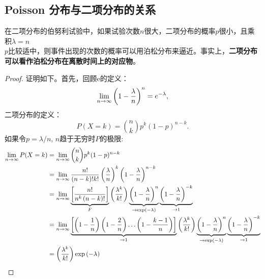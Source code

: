 \documentclass[openany]{book}
\begin{document}
\subsection{Poisson 分布与二项分布的关系}
在二项分布的伯努利试验中，如果试验次数$n$很大，二项分布的概率$p$很小，且乘积$\lambda = n$ \\$p$比较适中，则事件出现的次数的概率可以用泊松分布来逼近。事实上，\textbf{二项分布可以看作泊松分布在离散时间上的对应物}。
\begin{proof}
证明如下。首先，回顾e的定义：
$$
\lim _{{n\to \infty }}\left(1-{\lambda  \over n}\right)^{n}=e^{{-\lambda }},
$$
二项分布的定义：
$$
P(X=k)={n \choose k}p^{k}(1-p)^{{n-k}}.
$$
如果令$p=\lambda /n$, $n$趋于无穷时$P$的极限:
$$
\begin{aligned}
\lim_{{n \to \infty }}P(X=k) & =\lim _{{n\to \infty }}{n \choose k}p^{k}(1-p)^{{n-k}}\\
& = \lim _{{n\to \infty }}{n! \over (n-k)!k!}\left({\lambda \over n}\right)^{k}\left(1-{\lambda \over n}\right)^{{n-k}}\\
& = \lim _{{n\to \infty }}\underbrace {\left[{\frac {n!}{n^{k}\left(n-k\right)!}}\right]}_{F}\left({\frac {\lambda ^{k}}{k!}}\right)\underbrace {\left(1-{\frac {\lambda }{n}}\right)^{n}}_{{\to \exp \left(-\lambda \right)}}\underbrace {\left(1-{\frac {\lambda }{n}}\right)^{{-k}}}_{{\to 1}}\\
& = \lim _{{n\to \infty }}\underbrace {\left[\left(1-{\frac {1}{n}}\right)\left(1-{\frac {2}{n}}\right)\ldots \left(1-{\frac {k-1}{n}}\right)\right]}_{{\to 1}}\left({\frac {\lambda ^{k}}{k!}}\right)\underbrace {\left(1-{\frac {\lambda }{n}}\right)^{n}}_{{\to \exp \left(-\lambda \right)}}\underbrace {\left(1-{\frac {\lambda }{n}}\right)^{{-k}}}_{{\to 1}}\\
& = \left({\frac {\lambda ^{k}}{k!}}\right)\exp \left(-\lambda \right)
\end{aligned}
$$
\end{proof}
\end{document}
